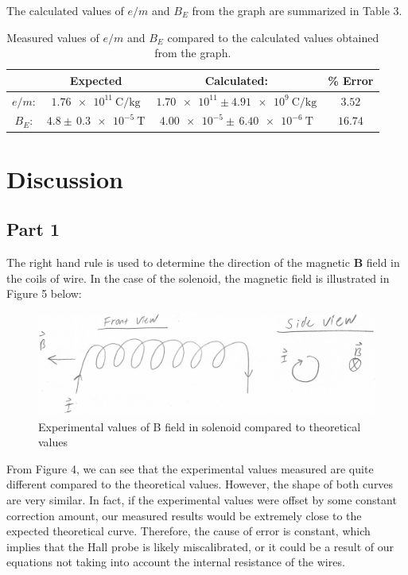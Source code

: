 \documentclass[letterpaper]{article}
\begin{document}
\vspace{1cm}
\noindent The calculated values of $e/m$ and $B_E$ from the graph are summarized in Table 3.
\begin{table}[H]
\centering
\begin{tabular}{c|c|c|c|}
                & Expected                      & Calculated:                                     & \% Error \\ \hline
$e/m$: & $\SI{1.76e11}{\coulomb\per\kilogram}$      & $\num{1.70e11} \pm \SI{4.91e9}{\coulomb\per\kilogram}$  &    $3.52$  \\ \hline
$B_E$: & $4.8 \pm \,\SI{0.3e-5}{\tesla}$           & $\num{4.00e-5} \pm \,\SI{6.40e-6}{\tesla}$                    &   $16.74$  \\ \hline
\end{tabular}
\caption{Measured values of $e/m$ and $B_E$ compared to the calculated values obtained from the graph.}
\end{table}

\section{Discussion}

\subsection{Part 1}

The right hand rule is used to determine the
direction of the magnetic $\textbf{B}$ field in the coils of wire. In the case of the
solenoid, the magnetic field is illustrated in Figure 5 below:

\begin{figure}[H]
    \centering
    \includegraphics[width=\textwidth]{question1.jpg}
    \caption{Experimental values of B field in solenoid compared to theoretical values}
\end{figure}

From Figure 4, we can see that the experimental values measured are quite different
compared to the theoretical values. However, the shape of both curves are very similar.
In fact, if the experimental values were offset by some constant correction amount, our
measured results would be extremely close to the expected theoretical curve. Therefore,
the cause of error is constant, which implies that the Hall probe is likely miscalibrated,
or it could be a result of our equations not taking into account the internal resistance of the wires.
\end{document}
